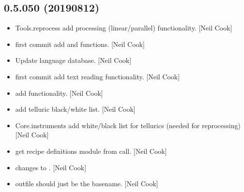 \documentclass[a4paper,10pt,english]{report}
\begin{document}
\subsection{0.5.050 (2019\sphinxhyphen{}08\sphinxhyphen{}12)}
\label{\detokenize{misc/changelog:id112}}\begin{itemize}
\item {} 
Tools.reprocess \sphinxhyphen{} add processing (linear/parallel) functionality.
{[}Neil Cook{]}

\item {} 
 \sphinxhyphen{} first commit \sphinxhyphen{} add  and
 functions. {[}Neil Cook{]}

\item {} 
Update language database. {[}Neil Cook{]}

\item {} 
 \sphinxhyphen{} first commit \sphinxhyphen{} add text reading functionality. {[}Neil
Cook{]}

\item {} 
 \sphinxhyphen{} add  functionality. {[}Neil Cook{]}

\item {} 
 \sphinxhyphen{} add telluric black/white list. {[}Neil
Cook{]}

\item {} 
Core.instruments \sphinxhyphen{} add white/black list for tellurics (needed for
reprocessing) {[}Neil Cook{]}

\item {} 
 \sphinxhyphen{} get recipe definitions module from call.
{[}Neil Cook{]}

\item {} 
 \sphinxhyphen{} changes to . {[}Neil Cook{]}

\item {} 
 \sphinxhyphen{} outfile should just be the basename. {[}Neil
Cook{]}

\end{itemize}
\end{document}
